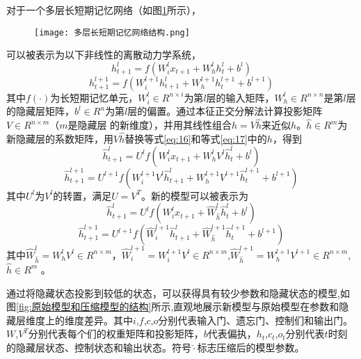 对于一个多层长短期记忆网络（如图\ref{fig:LSTM}所示），
\begin{figure}[hbp]
  \centering
  \texttt{[image: 多层长短期记忆网络结构.png]}
  \label{fig:LSTM}
\end{figure}
可以被表示为以下非线性的离散动力学系统，
\begin{equation}
\label{eq:16}
h_{t + 1}^l = f(W_i^l{x_{t + 1}} + W_h^lh_t^l + {b^l})
\end{equation}
\begin{equation}
\label{eq:17}
h_{t + 1}^{l + 1} = f(W_i^{l + 1}h_{t + 1}^l + W_h^{l + 1}h_t^{l + 1} + {b^{l + 1}})
\end{equation}
其中$f( \cdot )$为长短期记忆单元，$W_i^l \in {R^{n \times i}}$为第$l$层的输入矩阵，$W_h^l \in {R^{n \times n}}$是第$l$层的隐藏层矩阵，${b^l} \in {R^n}$为第$l$层的偏置。通过本征正交分解法计算投影矩阵$V \in {R^{n \times m}}$（$m$是隐藏层 的新维度），并用其线性组合$h = V\hat h$来近似$h$。$\hat h \in {R^m}$为新隐藏层的系数矩阵，用$V\hat h$替换等式\ref{eq:16}和等式\ref{eq:17}中的$h$，得到
\begin{equation}
  \label{eq:18}
  \hat h_{t + 1}^l = {U^l}f(W_i^l{x_{t + 1}} + W_h^l{V^l}\hat h_t^l + {b^l})
  \end{equation}
\begin{equation}
  \label{eq:19}
  \hat h_{t + 1}^{l + 1} = {U^{l + 1}}f(W_i^{l + 1}{V^l}\hat h_{t + 1}^l + W_h^{l + 1}{V^{l + 1}}\hat h_t^{l + 1} + {b^{l + 1}})
  \end{equation}
其中$U^l$为$V^l$的转置，满足$U=V^T$。新的模型可以被表示为
\begin{equation}
  \label{eq:18}
  \hat h_{t + 1}^l = {U^l}f(W_i^l{x_{t + 1}} + \hat W_{\hat h}^l\hat h_t^l + {b^l})
  \end{equation}
\begin{equation}
  \label{eq:19}
  \hat h_{t + 1}^{l + 1} = {U^{l + 1}}f(\hat W_i^{l + 1}\hat h_{t + 1}^l + \hat W_{\hat h}^{l + 1}\hat h_t^{l + 1} + {b^{l + 1}})
  \end{equation}
其中$\hat W_{\hat h}^l = W_h^l{V^l} \in {R^{n \times m}}$，$\hat W_i^{l + 1} = W_i^{l + 1}{V^l} \in {R^{n \times m}}$,$\hat W_{\hat h}^{l + 1} = W_h^{l + 1}{V^{l + 1}} \in {R^{n \times m}}$, $\hat h \in {R^m}$ 。

通过将隐藏状态投影到较低的状态，可以获得具有较少参数和隐藏状态的模型,如图\ref{fig:原始模型和压缩模型的结构}所示,直观地展示新模型与原始模型在参数和隐藏层维度上的维度差异。其中$i$,$f$,$c$,$o$分别代表输入门、遗忘门、控制们和输出门。$W$,$V^T$分别代表每个们的权重矩阵和投影矩阵，$b$代表偏执，$h_t$,$c_t$,$o_t$分别代表$t$时刻的隐藏层状态、控制状态和输出状态。符号$\hat  \cdot $标志压缩后的模型参数。

